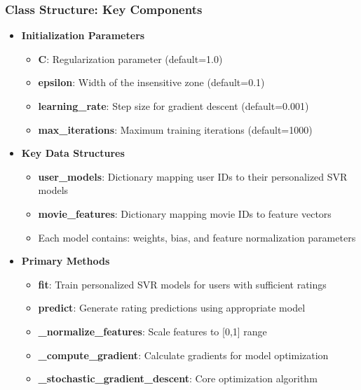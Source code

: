 \documentclass{beamer}
\begin{document}
\begin{frame}
\frametitle{Class Structure: Key Components}

\begin{itemize}
    \item \textbf{Initialization Parameters}
    \begin{itemize}
        \item \textbf{C}: Regularization parameter (default=1.0)
        \item \textbf{epsilon}: Width of the insensitive zone (default=0.1)
        \item \textbf{learning\_rate}: Step size for gradient descent (default=0.001)
        \item \textbf{max\_iterations}: Maximum training iterations (default=1000)
    \end{itemize}
    
    \item \textbf{Key Data Structures}
    \begin{itemize}
        \item \textbf{user\_models}: Dictionary mapping user IDs to their personalized SVR models
        \item \textbf{movie\_features}: Dictionary mapping movie IDs to feature vectors
        \item Each model contains: weights, bias, and feature normalization parameters
    \end{itemize}
    
    \item \textbf{Primary Methods}
    \begin{itemize}
        \item \textbf{fit}: Train personalized SVR models for users with sufficient ratings
        \item \textbf{predict}: Generate rating predictions using appropriate model
        \item \textbf{\_normalize\_features}: Scale features to [0,1] range
        \item \textbf{\_compute\_gradient}: Calculate gradients for model optimization
        \item \textbf{\_stochastic\_gradient\_descent}: Core optimization algorithm
    \end{itemize}
\end{itemize}
\end{frame}
\end{document}
